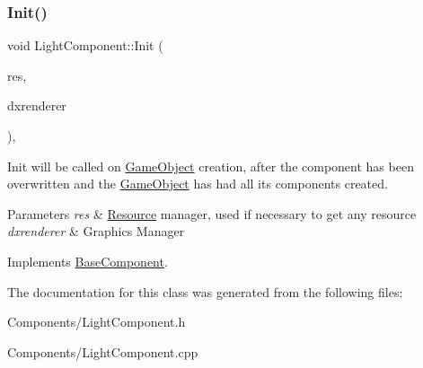 \subsubsection{\texorpdfstring{Init()}{Init()}}
{\footnotesize\ttfamily void Light\+Component\+::\+Init (\begin{DoxyParamCaption}\item[{\hyperlink{classResourceManager}{Resource\+Manager} $\ast$}]{res,  }\item[{\hyperlink{classDXRenderer}{D\+X\+Renderer} $\ast$}]{dxrenderer }\end{DoxyParamCaption})\hspace{0.3cm}{\ttfamily [override]}, {\ttfamily [virtual]}}



Init will be called on \hyperlink{classGameObject}{Game\+Object} creation, after the component has been overwritten and the \hyperlink{classGameObject}{Game\+Object} has had all its components created. 


\begin{DoxyParams}{Parameters}
{\em res} & \hyperlink{structResource}{Resource} manager, used if necessary to get any resource \\
\hline
{\em dxrenderer} & Graphic\textquotesingle{}s Manager \\
\hline
\end{DoxyParams}


Implements \hyperlink{classBaseComponent}{Base\+Component}.



The documentation for this class was generated from the following files\+:\begin{DoxyCompactItemize}
\item 
Components/Light\+Component.\+h\item 
Components/Light\+Component.\+cpp\end{DoxyCompactItemize}
